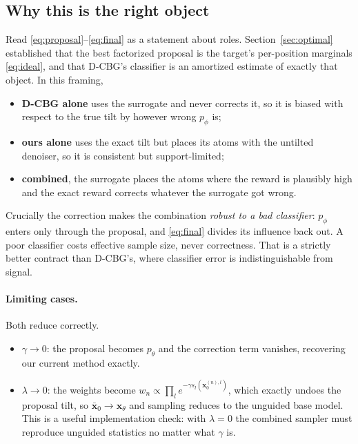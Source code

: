 \documentclass[11pt]{article}
\newcommand{\x}{\mathbf{x}}
\begin{document}
\subsection{Why this is the right object}

Read \eqref{eq:proposal}--\eqref{eq:final} as a statement about roles.
Section~\ref{sec:optimal} established that the best factorized proposal is the
target's per-position marginals \eqref{eq:ideal}, and that D-CBG's classifier is
an amortized estimate of exactly that object. In this framing,
\begin{itemize}
  \item \textbf{D-CBG alone} uses the surrogate and never corrects it, so it is
        biased with respect to the true tilt by however wrong $p_\phi$ is;
  \item \textbf{ours alone} uses the exact tilt but places its atoms with the
        untilted denoiser, so it is consistent but support-limited;
  \item \textbf{combined}, the surrogate places the atoms where the reward is
        plausibly high and the exact reward corrects whatever the surrogate got
        wrong.
\end{itemize}
Crucially the correction makes the combination \emph{robust to a bad
classifier}: $p_\phi$ enters only through the proposal, and \eqref{eq:final}
divides its influence back out. A poor classifier costs effective sample size,
never correctness. That is a strictly better contract than D-CBG's, where
classifier error is indistinguishable from signal.

\paragraph{Limiting cases.} Both reduce correctly.
\begin{itemize}
  \item $\gamma \to 0$: the proposal becomes $p_\theta$ and the correction term
        vanishes, recovering our current method exactly.
  \item $\lambda \to 0$: the weights become
        $w_n \propto \prod_l e^{-\gamma s_l(\x_0^{(n),l})}$, which exactly
        undoes the proposal tilt, so $\bar{\x}_0 \to \x_\theta$ and sampling
        reduces to the unguided base model. This is a useful implementation
        check: with $\lambda = 0$ the combined sampler must reproduce unguided
        statistics no matter what $\gamma$ is.
\end{itemize}
\end{document}
